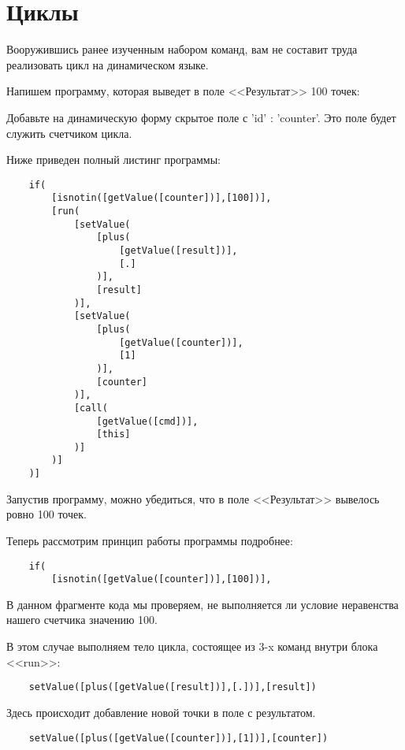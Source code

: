 \documentclass[../index.tex]{subfiles}
\begin{document}
\section{Циклы}\label{sec:loops}

    Вооружившись ранее изученным набором команд, вам не составит труда реализовать цикл на динамическом языке.
    
    Напишем программу, которая выведет в поле <<Результат>> 100 точек:
    
    Добавьте  на динамическую форму скрытое поле с 'id' : 'counter'. Это поле будет служить счетчиком цикла.
    
    Ниже приведен полный листинг программы:
    
    \begin{verbatim}
    if(
        [isnotin([getValue([counter])],[100])],
        [run(
            [setValue(
                [plus(
                    [getValue([result])],
                    [.]
                )],
                [result]
            )],
            [setValue(
                [plus(
                    [getValue([counter])],
                    [1]
                )],
                [counter]
            )],
            [call(
                [getValue([cmd])],
                [this]
            )]
        )]
    )]
    \end{verbatim}
    
    Запустив программу, можно убедиться, что в поле <<Результат>> вывелось ровно 100 точек.
    
    Теперь рассмотрим принцип работы программы подробнее:
    
    \begin{verbatim}
    if(
        [isnotin([getValue([counter])],[100])],
    \end{verbatim}
    
    В данном фрагменте кода мы проверяем, не выполняется ли условие неравенства нашего счетчика значению 100.
    
    В этом случае выполняем тело цикла, состоящее из 3-x команд внутри блока <<run>>:
    
    \begin{verbatim}
    setValue([plus([getValue([result])],[.])],[result])
    \end{verbatim}
    
    Здесь происходит добавление новой точки в поле с результатом.
    
    \begin{verbatim}
    setValue([plus([getValue([counter])],[1])],[counter])
    \end{verbatim}
    
\end{document}
